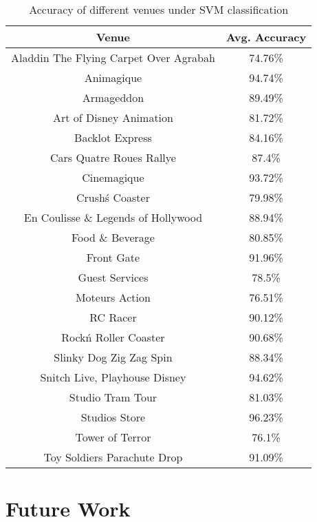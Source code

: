 \documentclass[12pt]{article}
\begin{document}
\begin{table}
\begin{center}
    \begin{tabular}{ | c | c | }
        \hline
        \textbf {Venue} & \textbf{Avg. Accuracy} \\ \hline
        \hline
        Aladdin The Flying Carpet Over Agrabah & 74.76\% \\ \hline
        Animagique & 94.74\% \\ \hline
        Armageddon & 89.49\% \\ \hline
        Art of Disney Animation & 81.72\% \\ \hline
        Backlot Express & 84.16\% \\ \hline
        Cars Quatre Roues Rallye & 87.4\% \\ \hline
        Cinemagique & 93.72\% \\ \hline
        Crush\'s Coaster & 79.98\% \\ \hline
        En Coulisse \& Legends of Hollywood & 88.94\% \\ \hline
        Food \& Beverage & 80.85\% \\ \hline
        Front Gate & 91.96\% \\ \hline
        Guest Services & 78.5\% \\ \hline
        Moteurs Action & 76.51\% \\ \hline
        RC Racer & 90.12\% \\ \hline
        Rock\'n Roller Coaster & 90.68\% \\ \hline
        Slinky Dog Zig Zag Spin & 88.34\% \\ \hline
        Snitch Live, Playhouse Disney & 94.62\% \\ \hline
        Studio Tram Tour & 81.03\% \\ \hline
        Studios Store & 96.23\% \\ \hline
        Tower of Terror & 76.1\% \\ \hline
        Toy Soldiers Parachute Drop & 91.09\% \\ \hline
    \end{tabular}
\caption{Accuracy of different venues under SVM classification}
\label{venue-accu}
\end{center}
\end{table}

\section{Future Work}\label{future_work}
\end{document}
